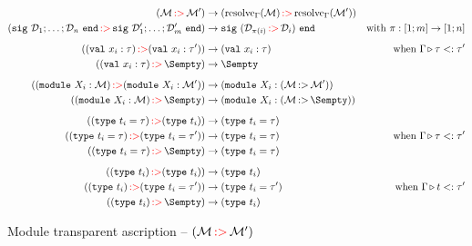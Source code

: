 \begin{align*}
  \Otransp{\iM}{\iM'}
  &\to \Otransp{\resolve{\E}{\iM}}{\resolve{\E}{\iM'}}\\
  \Otransp{\Ssig{\iD_1;\dots;\iD_n}}{\Ssig{\iD'_1;\dots;\iD'_m}}
  &\to \Ssig{\Otransp{\iD_{\pi(i)}}{\iD_i}}
  & \text{with } \pi:\rg{1}{m} \to \rg{1}{n}
  \\[2mm]
  \Otransp{(\Sval{x_i}{\tau})}{(\Sval{x_i}{\tau'})}
  &\to (\Sval{x_i}{\tau})
  & \text{when } \subtyp{\E}{\tau}{\tau'}
  \\
  \Otransp{(\Sval{x_i}{\tau})}{\Sempty}
  &\to \Sempty
  \\[2mm]
  \Otransp{(\Smodulety{X_i}{\iM})}{(\Smodulety{X_i}{\iM'})}
  &\to (\Smodulety{X_i}{\Stransp{\iM}{\iM'}})
  \\
  \Otransp{(\Smodulety{X_i}{\iM})}{\Sempty}
  &\to (\Smodulety{X_i}{\Stransp{\iM}{\Sempty}})
  \\[2mm]
  \Otransp{(\Stype{t_i}{\tau})}{(\Stypeabs{t_i})}
  &\to (\Stype{t_i}{\tau})
  \\
  \Otransp{(\Stype{t_i}{\tau})}{(\Stype{t_i}{\tau'})}
  &\to (\Stype{t_i}{\tau})
  & \text{when } \subtyp{\E}{\tau}{\tau'}
  \\
  \Otransp{(\Stype{t_i}{\tau})}{\Sempty}
  &\to (\Stype{t_i}{\tau})
  \\[2mm]
  \Otransp{(\Stypeabs{t_i})}{(\Stypeabs{t_i})}
  &\to (\Stypeabs{t_i})
  \\
  \Otransp{(\Stypeabs{t_i})}{(\Stype{t_i}{\tau'})}
  &\to (\Stype{t_i}{\tau'})
  & \text{when } \subtyp{\E}{t}{\tau'}
  \\
  \Otransp{(\Stypeabs{t_i})}{\Sempty}
  &\to (\Stypeabs{t_i})\\
\end{align*}\vspace{-3mm}
\caption{Module transparent ascription -- $(\mathcal M \operatorname{{\color{red}:\!>}} \mathcal M')$}
\label{module:transp}

